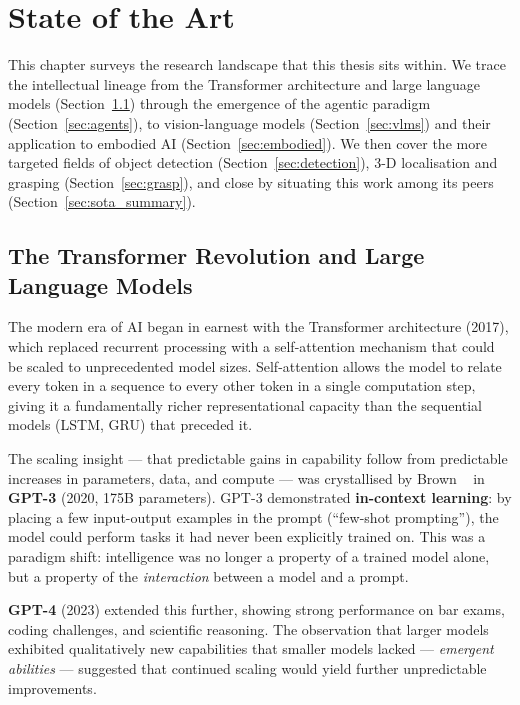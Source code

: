 \chapter{State of the Art}
\label{ch:sota}

This chapter surveys the research landscape that this thesis sits within.
We trace the intellectual lineage from the Transformer architecture and large language
models (Section~\ref{sec:llm}) through the emergence of the agentic paradigm
(Section~\ref{sec:agents}), to vision-language models (Section~\ref{sec:vlms}) and
their application to embodied AI (Section~\ref{sec:embodied}).
We then cover the more targeted fields of object detection (Section~\ref{sec:detection}),
3-D localisation and grasping (Section~\ref{sec:grasp}), and close by situating this
work among its peers (Section~\ref{sec:sota_summary}).

\section{The Transformer Revolution and Large Language Models}
\label{sec:llm}

The modern era of AI began in earnest with the Transformer architecture
\cite{vaswani2017attention} (2017), which replaced recurrent processing with a
self-attention mechanism that could be scaled to unprecedented model sizes.
Self-attention allows the model to relate every token in a sequence to every other
token in a single computation step, giving it a fundamentally richer representational
capacity than the sequential models (LSTM, GRU) that preceded it.

The scaling insight --- that predictable gains in capability follow from predictable
increases in parameters, data, and compute --- was crystallised by
Brown \etal~\cite{brown2020gpt3} in \textbf{GPT-3} (2020, 175B parameters).
GPT-3 demonstrated \textbf{in-context learning}: by placing a few input-output
examples in the prompt (``few-shot prompting''), the model could perform tasks it
had never been explicitly trained on.
This was a paradigm shift: intelligence was no longer a property of a trained model
alone, but a property of the \emph{interaction} between a model and a prompt.

\textbf{GPT-4} \cite{achiam2023gpt4} (2023) extended this further, showing strong
performance on bar exams, coding challenges, and scientific reasoning.
The observation that larger models exhibited qualitatively new capabilities that smaller
models lacked --- \emph{emergent abilities} --- suggested that continued scaling would
yield further unpredictable improvements.

